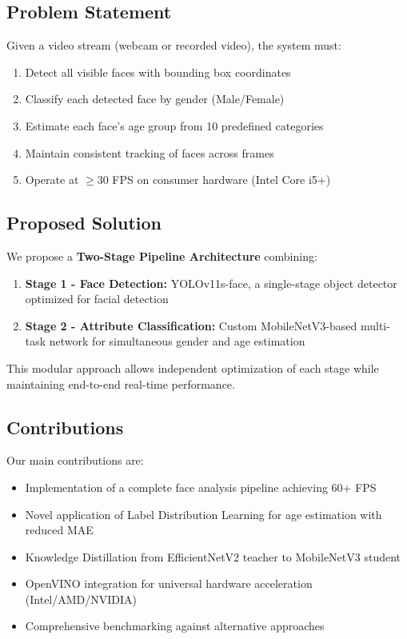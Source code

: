 \documentclass[12pt,a4paper]{article}
\begin{document}
\subsection{Problem Statement}

Given a video stream (webcam or recorded video), the system must:

\begin{enumerate}[noitemsep]
    \item Detect all visible faces with bounding box coordinates
    \item Classify each detected face by gender (Male/Female)
    \item Estimate each face's age group from 10 predefined categories
    \item Maintain consistent tracking of faces across frames
    \item Operate at $\geq$30 FPS on consumer hardware (Intel Core i5+)
\end{enumerate}

\subsection{Proposed Solution}

We propose a \textbf{Two-Stage Pipeline Architecture} combining:

\begin{enumerate}
    \item \textbf{Stage 1 - Face Detection:} YOLOv11s-face, a single-stage object detector optimized for facial detection
    \item \textbf{Stage 2 - Attribute Classification:} Custom MobileNetV3-based multi-task network for simultaneous gender and age estimation
\end{enumerate}

This modular approach allows independent optimization of each stage while maintaining end-to-end real-time performance.

\subsection{Contributions}

Our main contributions are:

\begin{itemize}[noitemsep]
    \item Implementation of a complete face analysis pipeline achieving 60+ FPS
    \item Novel application of Label Distribution Learning for age estimation with reduced MAE
    \item Knowledge Distillation from EfficientNetV2 teacher to MobileNetV3 student
    \item OpenVINO integration for universal hardware acceleration (Intel/AMD/NVIDIA)
    \item Comprehensive benchmarking against alternative approaches
\end{itemize}
\end{document}
